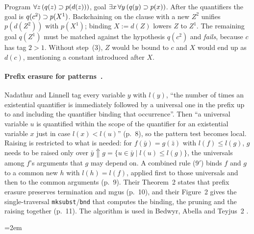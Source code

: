 \begin{example}
Program $\forall z\,(q(z)\supset p(d(z)))$, goal $\exists x\,\forall y\,(q(y)\supset p(x))$. After the quantifiers the goal
is $q(c^2)\supset p(X^1)$. Backchaining on the clause with a new $Z^2$ unifies $p(d(Z^2))$ with $p(X^1)$; binding
$X:=d(Z)$ lowers $Z$ to $Z^1$. The remaining goal $q(Z^1)$ must be matched against the hypothesis $q(c^2)$ and
\emph{fails}, because $c$ has tag $2>1$. Without step~(3), $Z$ would be bound to $c$ and $X$ would end up as
$d(c)$, mentioning a constant introduced after $X$.
\end{example}

\paragraph{Prefix erasure for patterns~\cite{NadathurLinnell2005}.} Nadathur and Linnell tag every variable $y$ with
$l(y)$, \enquote{the number of times an existential quantifier is immediately followed by a universal one in the prefix
up to and including the quantifier binding that occurrence}. Then \enquote{a universal variable $u$ is quantified
within the scope of the quantifier for an existential variable $x$ just in case $l(x)<l(u)$} (p.~8), so the pattern
test becomes local. Raising is restricted to what is needed: for $f(\bar y)=g(\bar z)$ with $l(f)\le l(g)$, $g$ needs
to be raised only over $\bar y{\Uparrow}g=\{u\in\bar y\mid l(u)\le l(g)\}$, the universals among $f$'s arguments that
$g$ may depend on. A combined rule (9$'$) binds $f$ and $g$ to a common new $h$ with $l(h)=l(f)$, applied first to
those universals and then to the common arguments (p.~9). Their Theorem~2 states that prefix erasure preserves
termination and mgus (p.~10), and their Figure~2 gives the single-traversal \texttt{mksubst}/\texttt{bnd} that
computes the binding, the pruning and the raising together (p.~11). The algorithm is used in Bedwyr, Abella and
Teyjus~2 .

\begingroup\emergencystretch=2em
